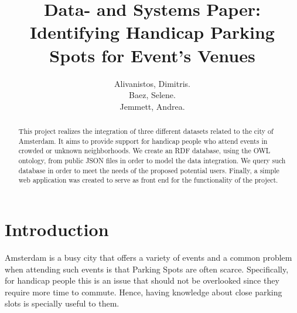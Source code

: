 \documentclass[runningheads,a4paper]{../../StyleFiles/llncs}
\begin{document}
\mainmatter  %

\title{Data- and Systems Paper: Identifying Handicap Parking Spots for Event's Venues}


%
%
\author{Alivanistos, Dimitris. \\ Baez, Selene. \\ Jemmett, Andrea. }
%


\maketitle


\begin{abstract}
	This project realizes the integration of three different datasets related to the city of Amsterdam. It aims to provide support for handicap people who attend events in crowded or unknown neighborhoods.
	We create an RDF database, using the OWL ontology, from public JSON files in order to model the data integration. We query such database in order to meet the needs of the proposed potential users. Finally, a simple web application was created to serve as front end for the functionality of the project. 
\end{abstract}


\section{Introduction}
Amsterdam is a busy city that offers a variety of events and a common problem when attending such events is that Parking Spots are often scarce. Specifically, for handicap people this is an issue that should not be overlooked since they require more time to commute. Hence, having knowledge about close parking slots is specially useful to them. 
\end{document}
